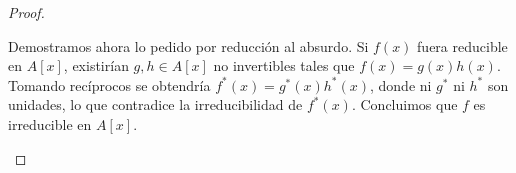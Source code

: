 \begin{proof}
\begin{enumerate}[label=\roman*)]
        Demostramos ahora lo pedido por reducción al absurdo.
        Si $f(x)$ fuera reducible en $A[x]$, existirían $g, h \in A[x]$ no invertibles tales que $f(x) = g(x)h(x)$. Tomando recíprocos se obtendría $f^*(x) = g^*(x)h^*(x)$, donde ni $g^*$ ni $h^*$ son unidades, lo que contradice la irreducibilidad de $f^*(x)$. Concluimos que $f$ es irreducible en $A[x]$.
    \end{enumerate}
\end{proof}


